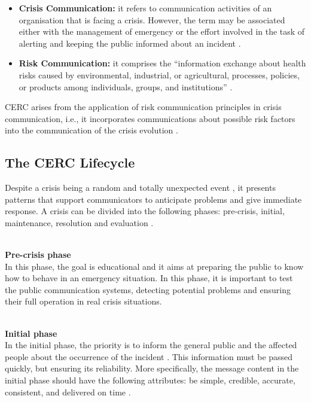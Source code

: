 \begin{itemize}
   \item \textbf{Crisis Communication:} it refers to communication activities of an organisation that is facing a crisis. However, the term may be associated either with the management of emergency or the effort involved in the task of alerting and keeping the public informed about an incident \cite{cdc2014}. 
   \item \textbf{Risk Communication:} it comprises the “information exchange about health risks caused by environmental, industrial, or agricultural, processes, policies, or products among individuals, groups, and institutions” \cite{glik2007}.
 \end{itemize}

CERC arises from the application of risk communication principles in crisis communication, i.e., it incorporates communications about possible risk factors into the communication of the crisis evolution \cite{reynolds2005}.

\subsection{The CERC Lifecycle}  \label{cercPhase}
Despite a crisis being a random and totally unexpected event \cite{cdc2014}, it presents patterns that support communicators to anticipate problems and give immediate response. A crisis can be divided into the following phases: pre-crisis, initial, maintenance, resolution and evaluation \cite{cdc2014} \cite{reynolds2005}.
 
 
\textbf{\\Pre-crisis phase\\}
In this phase, the goal is educational and it aims at preparing the public to know how to behave in an emergency situation. In this phase, it is important to test the public communication systems, detecting potential problems and ensuring their full operation in real crisis situations.

\textbf{\\Initial phase\\}
In the initial phase, the priority is to inform the general public and the affected people about the occurrence of the incident \cite{reynolds2005}. This information must be passed quickly, but ensuring its reliability. More specifically, the message content in the initial phase should have the following attributes: be simple, credible, accurate, consistent, and delivered on time \cite{cdc2014}.

